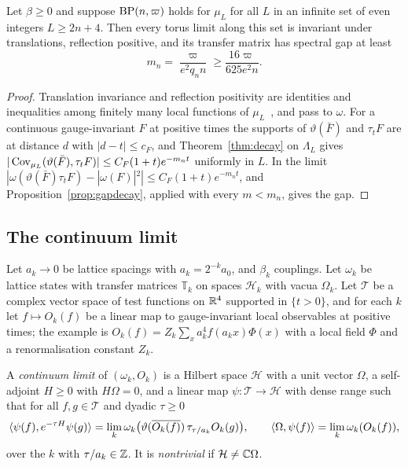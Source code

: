 \begin{corollary}\label{cor:latticegap}
Let $\beta\ge0$ and suppose $\mathrm{BP}(n,\varpi)$ holds for $\mu_L$ for all $L$ in an
infinite set of even integers $L\ge2n+4$. Then every torus limit along this
set is invariant under translations, reflection positive, and its transfer
matrix has spectral gap at least
\[
m_n=\frac{\varpi}{e^2q_nn}\ge\frac{16\varpi}{625e^2n}.
\]
\end{corollary}

\begin{proof}
Translation invariance and reflection positivity are identities and
inequalities among finitely many local functions of $\mu_L$~\cite{OSei78}, and
pass to $\omega$. For a continuous gauge-invariant $F$ at positive times the
supports of $\vartheta(\bar F)$ and $\tau_tF$ are at distance $d$ with $|d-t|\le
c_F$, and Theorem~\ref{thm:decay} on $\Lambda_L$ gives $|\operatorname{Cov}_{\mu_L}(\vartheta(\bar
F),\tau_tF)|\le C_F(1+t)e^{-m_nt}$ uniformly in $L$. In the limit
$|\omega(\vartheta(\bar F)\tau_tF)-|\omega(F)|^2|\le C_F(1+t)e^{-m_nt}$, and
Proposition~\ref{prop:gapdecay}, applied with every $m<m_n$, gives the gap.
\end{proof}

\subsection{The continuum limit}

Let $a_k\to0$ be lattice spacings with $a_k=2^{-k}a_0$, and $\beta_k$ couplings.
Let $\omega_k$ be lattice states with transfer matrices $\mathbb T_k$ on spaces
$\mathcal H_k$ with vacua $\Omega_k$. Let $\mathcal T$ be a complex vector space of
test functions on $\mathbb{R}^4$ supported in $\{t>0\}$, and for each $k$ let $f\mapsto
O_k(f)$ be a linear map to gauge-invariant local observables at positive
times; the example is $O_k(f)=Z_k\sum_xa_k^4f(a_kx)\Phi(x)$ with a local field
$\Phi$ and a renormalisation constant $Z_k$.

\begin{definition}\label{def:limit}
A \emph{continuum limit} of $(\omega_k,O_k)$ is a Hilbert space $\mathcal H$ with
a unit vector $\Omega$, a self-adjoint $H\ge0$ with $H\Omega=0$, and a linear
map $\psi:\mathcal T\to\mathcal H$ with dense range such that for all
$f,g\in\mathcal T$ and dyadic $\tau\ge0$
\[
\langle \psi(f),e^{-\tau H}\psi(g)\rangle=\lim_k\omega_k\bigl(\vartheta(\overline{O_k(f)})
\,\tau_{\tau/a_k}O_k(g)\bigr),\qquad
\langle \Omega,\psi(f)\rangle=\lim_k\omega_k(O_k(f)),
\]
over the $k$ with $\tau/a_k\in\mathbb{Z}$. It is \emph{nontrivial} if $\mathcal H\ne\mathbb{C}
\Omega$.
\end{definition}

